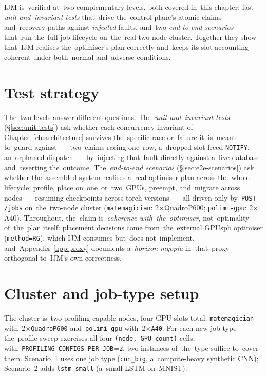 IJM is~verified at~two complementary levels, both covered in~this chapter:
fast \emph{unit and~invariant tests} that~drive the~control plane's atomic
claims and~recovery paths against \emph{injected} faults, and~two
\emph{end-to-end scenarios} that~run the~full job lifecycle on~the~real
two-node cluster.  Together they show that~IJM realises the~optimiser's plan
correctly and~keeps its slot accounting coherent under both~normal and~adverse
conditions.

\section{Test strategy}
\label{sec:test-strategy}

The~two levels answer different questions.  The~\emph{unit and~invariant tests}
(\S\ref{sec:unit-tests}) ask whether each concurrency invariant of
Chapter~\ref{ch:architecture} survives the~specific race or~failure it~is~meant
to~guard against~--- two~claims racing one~row, a~dropped slot-freed
\texttt{NOTIFY}, an~orphaned dispatch~--- by~injecting that~fault directly
against a~live database and~asserting the~outcome.  The~\emph{end-to-end
scenarios} (\S\ref{sec:e2e-scenarios}) ask whether the~assembled system
realises a~real optimiser plan across the~whole lifecycle: profile, place
on~one~or~two~GPUs, preempt, and~migrate across nodes~--- resuming checkpoints
across torch versions~--- all driven only by~\texttt{POST /jobs} on~the~two-node
cluster (\texttt{matemagician}: 2$\times$QuadroP600; \texttt{polimi-gpu}:
2$\times$A40).  Throughout, the~claim is~\emph{coherence with~the~optimiser},
not~optimality of~the~plan itself: placement decisions come from~the~external
GPUspb optimiser (\texttt{method=RG}), which IJM consumes but~does
not~implement, and~Appendix~\ref{app:proxy} documents a~\emph{horizon-myopia}
in~that~proxy~--- orthogonal to~IJM's own correctness.

\section{Cluster and job-type setup}
\label{sec:e2e-setup}

The cluster is~two profiling-capable nodes, four GPU slots total:
\texttt{matemagician} with~2$\times$\texttt{QuadroP600} and~\texttt{polimi-gpu}
with~2$\times$\texttt{A40}.  For each new job type the~profile sweep exercises
all four \texttt{(node, GPU-count)} cells; with~\texttt{PROFILING\_CONFIGS\_PER\_JOB}{=}2,
two instances of~the~type suffice to~cover them.  Scenario~1 uses one job type
(\texttt{cnn\_big}, a~compute-heavy synthetic CNN); Scenario~2 adds
\texttt{lstm-small} (a~small LSTM on~MNIST).

